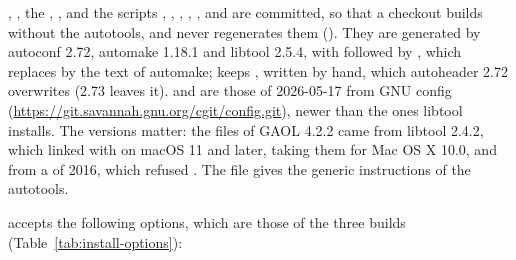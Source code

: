 \documentclass[12pt,a4paper,twoside,openright]{book}
\begin{document}
\medskip
{}, , the ,
,  and the scripts ,
, , , ,
 and  are committed, so that a checkout
builds without the autotools, and  never regenerates them
(). They are generated by autoconf
2.72, automake 1.18.1 and libtool 2.5.4, with  followed by , which
 replaces by the text of automake; 
keeps , written by hand, which autoheader
2.72 overwrites (2.73 leaves it).  and 
are those of 2026-05-17 from GNU config
(\url{https://git.savannah.gnu.org/cgit/config.git}), newer than the ones
libtool installs. The versions matter: the files of GAOL 4.2.2 came from
libtool 2.4.2, which linked  with  on macOS 11 and later, taking them for Mac OS X 10.0,
and from a  of 2016, which refused
.\newinvfive{} The file  gives the generic
instructions of the autotools.

\medskip
{} accepts the following options, which are those of the three
builds (Table~\ref{tab:install-options}):
\end{document}
